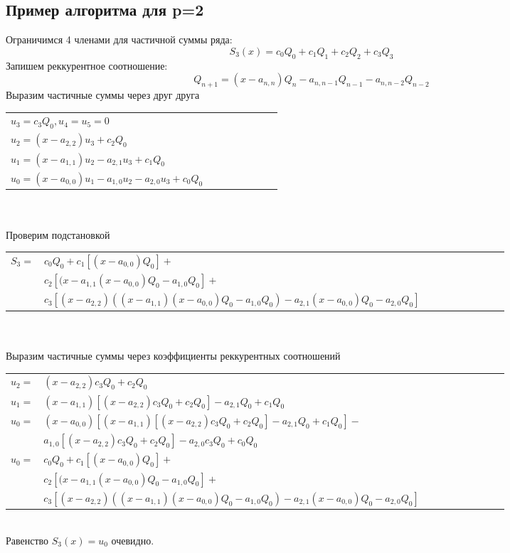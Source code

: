 \subsection {Пример алгоритма для p=2}
Ограничимся 4 членами для частичной суммы ряда:
$$
S_3(x)=c_0Q_0+c_1Q_1+c_2Q_2+c_3Q_3
$$ 
Запишем реккурентное соотношение:
$$
Q_{n+1}=(x-a_{n,n})Q_n-a_{n,n-1}Q_{n-1}-a_{n,n-2}Q_{n-2} 
$$
Выразим частичные суммы через друг друга\\
\begin{tabular} {llllllll}
$u_3=c_3Q_0, u_4=u_5=0$ \\
$u_2=(x-a_{2,2})u_3 + c_2Q_0$ \\
$u_1=(x-a_{1,1})u_2-a_{2,1}u_3+c_1Q_0$ \\
$u_0=(x-a_{0,0})u_1-a_{1,0}u_2-a_{2,0}u_3+c_0Q_0$ \\
\end{tabular} \\ \\
Проверим подстановкой \\
\begin{tabular} {llllllllll}
$S_3=$ & $c_0Q_0+c_1[(x-a_{0,0})Q_0]+$\\
& $c_2[(x-a_{1,1}(x-a_{0,0})Q_0-a_{1,0}Q_0]+$\\
& $c_3[(x-a_{2,2})((x-a_{1,1})(x-a_{0,0})Q_0-a_{1,0}Q_0)-a_{2,1}(x-a_{0,0})Q_0-a_{2,0}Q_0]$ \\
\end{tabular}\\ \\
Выразим частичные суммы через коэффициенты реккурентных соотношений\\
\begin{tabular} {llllllllll}
$u_2=$ & $(x-a_{2,2})c_3Q_0+c_2Q_0$ \\
$u_1=$ & $(x-a_{1,1})[(x-a_{2,2})c_3Q_0+c_2Q_0]-a_{2,1}Q_0+c_1Q_0$ \\
$u_0=$ & $(x-a_{0,0})[(x-a_{1,1})[(x-a_{2,2})c_3Q_0+c_2Q_0]-a_{2,1}Q_0+c_1Q_0]-$ \\
& $a_{1,0}[(x-a_{2,2})c_3Q_0+c_2Q_0]-a_{2,0}c_3Q_0+c_0Q_0$\\ 
$u_0=$  & $c_0Q_0+c_1[(x-a_{0,0})Q_0]+$\\
& $c_2[(x-a_{1,1}(x-a_{0,0})Q_0-a_{1,0}Q_0]+$\\
& $c_3[(x-a_{2,2})((x-a_{1,1})(x-a_{0,0})Q_0-a_{1,0}Q_0)-a_{2,1}(x-a_{0,0})Q_0-a_{2,0}Q_0]$ \\
\end{tabular}\\
Равенство $S_3(x)=u_0$ очевидно.